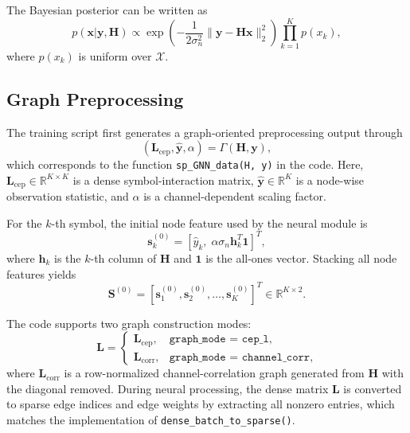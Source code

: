 \documentclass[conference]{IEEEtran}
\begin{document}
The Bayesian posterior can be written as
\begin{equation}
p(\mathbf{x}|\mathbf{y},\mathbf{H})
\propto
\exp\!\left(
-\frac{1}{2\sigma_n^2}\|\mathbf{y}-\mathbf{H}\mathbf{x}\|_2^2
\right)
\prod_{k=1}^{K} p(x_k),
\label{eq:posterior}
\end{equation}
where $p(x_k)$ is uniform over $\mathcal{X}$.

\subsection{Graph Preprocessing}

The training script first generates a graph-oriented preprocessing output through
\begin{equation}
(\mathbf{L}_{\mathrm{cep}}, \hat{\mathbf{y}}, \alpha) = \Gamma(\mathbf{H}, \mathbf{y}),
\label{eq:preprocess}
\end{equation}
which corresponds to the function \texttt{sp\_GNN\_data(H, y)} in the code. Here, $\mathbf{L}_{\mathrm{cep}}\in\mathbb{R}^{K\times K}$ is a dense symbol-interaction matrix, $\hat{\mathbf{y}}\in\mathbb{R}^K$ is a node-wise observation statistic, and $\alpha$ is a channel-dependent scaling factor.

For the $k$-th symbol, the initial node feature used by the neural module is
\begin{equation}
\mathbf{s}_k^{(0)}=
\left[
\hat{y}_k,\;
\alpha \sigma_n \mathbf{h}_k^T\mathbf{1}
\right]^T,
\label{eq:init_feature}
\end{equation}
where $\mathbf{h}_k$ is the $k$-th column of $\mathbf{H}$ and $\mathbf{1}$ is the all-ones vector. Stacking all node features yields
\begin{equation}
\mathbf{S}^{(0)}=
[\mathbf{s}_1^{(0)},\mathbf{s}_2^{(0)},\ldots,\mathbf{s}_K^{(0)}]^T
\in\mathbb{R}^{K\times 2}.
\end{equation}

The code supports two graph construction modes:
\begin{equation}
\mathbf{L} =
\begin{cases}
\mathbf{L}_{\mathrm{cep}}, & \texttt{graph\_mode = cep\_l},\\
\mathbf{L}_{\mathrm{corr}}, & \texttt{graph\_mode = channel\_corr},
\end{cases}
\label{eq:graph_mode}
\end{equation}
where $\mathbf{L}_{\mathrm{corr}}$ is a row-normalized channel-correlation graph generated from $\mathbf{H}$ with the diagonal removed. During neural processing, the dense matrix $\mathbf{L}$ is converted to sparse edge indices and edge weights by extracting all nonzero entries, which matches the implementation of \texttt{dense\_batch\_to\_sparse()}.
\end{document}

